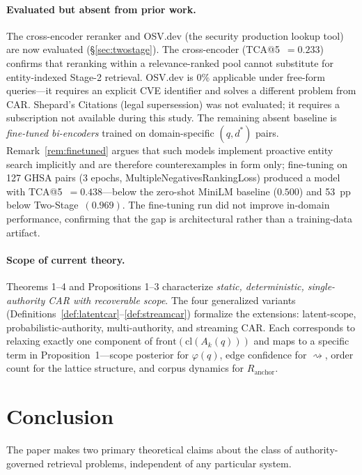 \documentclass[11pt]{article}
\begin{document}
\paragraph{Evaluated but absent from prior work.} The cross-encoder reranker and OSV.dev (the security production lookup tool) are now evaluated (\S\ref{sec:twostage}). The cross-encoder (TCA@5~$= 0.233$) confirms that reranking within a relevance-ranked pool cannot substitute for entity-indexed Stage-2 retrieval. OSV.dev is 0\% applicable under free-form queries---it requires an explicit CVE identifier and solves a different problem from CAR. Shepard's Citations (legal supersession) was not evaluated; it requires a subscription not available during this study. The remaining absent baseline is \emph{fine-tuned bi-encoders} trained on domain-specific $(q, d^*)$ pairs. Remark~\ref{rem:finetuned} argues that such models implement proactive entity search implicitly and are therefore counterexamples in form only; fine-tuning on 127 GHSA pairs (3 epochs, MultipleNegativesRankingLoss) produced a model with TCA@5~$= 0.438$---below the zero-shot MiniLM baseline ($0.500$) and 53~pp below Two-Stage~$(0.969)$. The fine-tuning run did not improve in-domain performance, confirming that the gap is architectural rather than a training-data artifact.

\paragraph{Scope of current theory.} Theorems 1--4 and Propositions 1--3 characterize \emph{static, deterministic, single-authority CAR with recoverable scope}. The four generalized variants (Definitions~\ref{def:latentcar}--\ref{def:streamcar}) formalize the extensions: latent-scope, probabilistic-authority, multi-authority, and streaming CAR. Each corresponds to relaxing exactly one component of $\mathrm{front}(\mathrm{cl}(A_k(q)))$ and maps to a specific term in Proposition~1---scope posterior for $\varphi(q)$, edge confidence for $\rightsquigarrow$, order count for the lattice structure, and corpus dynamics for $R_{\mathrm{anchor}}$.

\section{Conclusion}
\label{sec:conclusion}

The paper makes two primary theoretical claims about the class of authority-governed retrieval problems, independent of any particular system.
\end{document}
